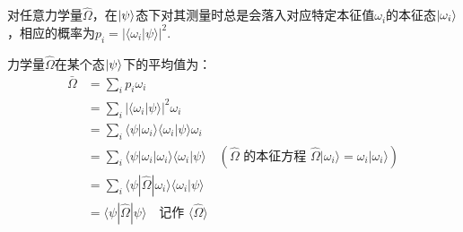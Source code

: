 对任意力学量$\hat{\Omega}$，在$\ket{\psi}$态下对其测量时总是会落入对应特定本征值$\omega_i$的本征态$\ket{\omega_i}$，相应的概率为$p_i = |\langle \omega_i | \psi \rangle|^2$.

力学量$\hat{\Omega}$在某个态$\ket{\psi}$下的平均值为：
\begin{align*}
    \bar{\Omega} &= \sum_i p_i \omega_i \\
    &= \sum_i |\langle \omega_i | \psi \rangle|^2 \omega_i \\
    &= \sum_i \langle \psi | \omega_i \rangle \langle \omega_i | \psi \rangle \omega_i \\
    &= \sum_i \langle \psi | \omega_i | \omega_i \rangle \langle \omega_i | \psi \rangle \quad (\hat{\Omega} \text{ 的本征方程 } \hat{\Omega} |\omega_i\rangle = \omega_i |\omega_i\rangle) \\
    &= \sum_i \langle \psi | \hat{\Omega} | \omega_i \rangle \langle \omega_i | \psi \rangle \\
    &= \langle \psi | \hat{\Omega} | \psi \rangle \quad \text{记作 } \langle \hat{\Omega} \rangle
\end{align*}

